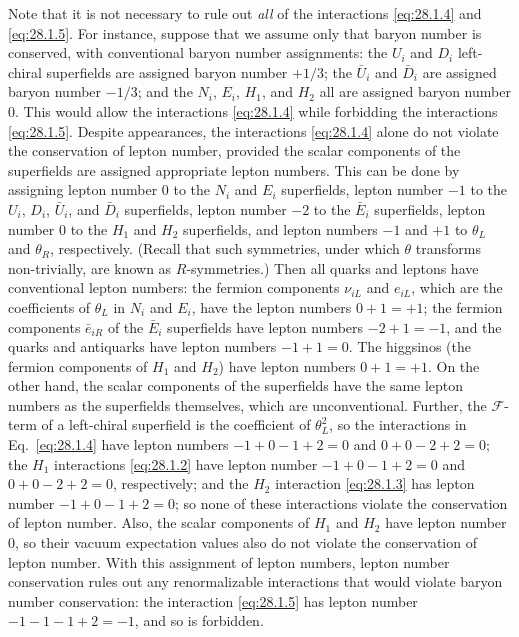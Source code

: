 Note that it is not necessary to rule out \textit{all} of the
interactions \eqref{eq:28.1.4} and \eqref{eq:28.1.5}. For instance,
suppose that we assume only that baryon number is conserved, with
conventional baryon number assignments: the \(U_i\) and \(D_i\)
left-chiral superfields are assigned baryon number \(+1/3\); the
\(\bar U_i\) and \(\bar D_i\) are assigned baryon number \(-1/3\); and
the \(N_i\), \(E_i\), \(H_1\), and \(H_2\) all are assigned baryon
number 0. This would allow the interactions \eqref{eq:28.1.4} while
forbidding the interactions \eqref{eq:28.1.5}. Despite appearances, the
interactions \eqref{eq:28.1.4} alone do not violate the conservation of
lepton number, provided the scalar components of the superfields are
assigned appropriate lepton numbers. This can be done by assigning
lepton number 0 to the \(N_i\) and \(E_i\) superfields, lepton number
\(-1\) to the \(U_i\), \(D_i\), \(\bar U_i\), and \(\bar D_i\)
superfields, lepton number \(-2\) to the \(\bar E_i\) superfields,
lepton number 0 to the \(H_1\) and \(H_2\) superfields, and lepton
numbers \(-1\) and \(+1\) to \(\theta_L\) and \(\theta_R\),
respectively. (Recall that such symmetries, under which \(\theta\)
transforms non-trivially, are known as \(R\)-symmetries.) Then all quarks
and leptons have conventional lepton numbers: the fermion components
\(\nu_{iL}\) and \(e_{iL}\), which are the coefficients of \(\theta_L\)
in \(N_i\) and \(E_i\), have the lepton numbers \(0+1=+1\); the fermion
components \(\bar e_{iR}\) of the \(\bar E_i\) superfields have lepton
numbers \(-2+1=-1\), and the quarks and antiquarks have lepton numbers
\(-1+1=0\). The higgsinos (the fermion components of \(H_1\) and
\(H_2\)) have lepton numbers \(0+1=+1\). On the other hand, the scalar
components of the superfields have the same lepton numbers as the
superfields themselves, which are unconventional. Further, the
\(\mathcal{F}\)-term of a left-chiral superfield is the coefficient of
\(\theta_L^2\), so the interactions in Eq.~\eqref{eq:28.1.4} have
lepton numbers \(-1+0-1+2=0\) and \(0+0-2+2=0\); the \(H_1\)
interactions \eqref{eq:28.1.2} have lepton number
\(-1+0-1+2=0\) and \(0+0-2+2=0\), respectively; and the \(H_2\)
interaction \eqref{eq:28.1.3} has lepton number
\(-1+0-1+2=0\); so none of these interactions violate the conservation
of lepton number. Also, the scalar components of \(H_1\) and \(H_2\)
have lepton number 0, so their vacuum expectation values also do not
violate the conservation of lepton number. With this assignment of
lepton numbers, lepton number conservation rules out any renormalizable
interactions that would violate baryon number conservation: the
interaction \eqref{eq:28.1.5} has lepton number
\(-1-1-1+2=-1\), and so is forbidden.

